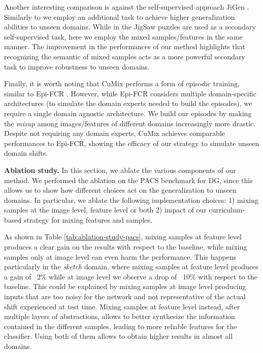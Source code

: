 \documentclass[runningheads]{llncs}
\newcommand{\myparagraph}[1]{\noindent\textbf{#1}}
\newcommand{\methodName}{{CuMix} }
\begin{document}
Another interesting comparison is against the self-supervised approach JiGen \cite{carlucci2019domain}. Similarly to \cite{carlucci2019domain} we employ an additional task to achieve higher generalization abilities to unseen domains. While in \cite{carlucci2019domain} the JigSaw puzzles \cite{noroozi2016unsupervised} are used as a secondary self-supervised task, here we employ the mixed samples/features in the same manner. 
The improvement in the performances of our method highlights that recognizing the semantic of mixed samples acts as a more powerful secondary task to improve robustness to unseen domains.

Finally, it is worth noting that \methodName performs a form of episodic training, similar to Epi-FCR \cite{li2019episodic}. However, while Epi-FCR considers multiple domain-specific architectures (to simulate the domain experts needed to build the episodes), we require a single domain agnostic architecture. We build  
our episodes by making the \textit{mixup} among images/features of different domains increasingly more drastic. Despite not requiring any domain experts, \methodName achieves comparable performances to Epi-FCR, showing the efficacy of our strategy to simulate unseen domain shifts. 


\myparagraph{Ablation study.} In this section, we ablate the various components of our method. We performed the ablation on the PACS benchmark for DG, since this allows us to show how different choices act on the generalization to unseen domains. In particular, we ablate the following implementation choices: 1) mixing samples at the image level, feature level or both 2) impact of our curriculum-based strategy for mixing features and samples. 

As shown in Table \ref{tab:ablation-study-pacs}, mixing samples at feature level produces a clear gain on the results with respect to the baseline, while mixing samples only at image level can even harm the performance. This happens particularly in the \textit{sketch} domain, where mixing samples at feature level produces a gain of ~2\% while at image level we observe a drop of ~10\% with respect to the baseline. This could be explained by mixing samples at image level producing inputs that are too noisy for the network and not representative of the actual shift experienced at test time. Mixing samples at feature level instead, after multiple layers of abstractions, allows to better synthesize the information contained in the different samples, leading to more reliable features for the classifier. Using both of them allows to obtain higher results in almost all domains. 
\end{document}
